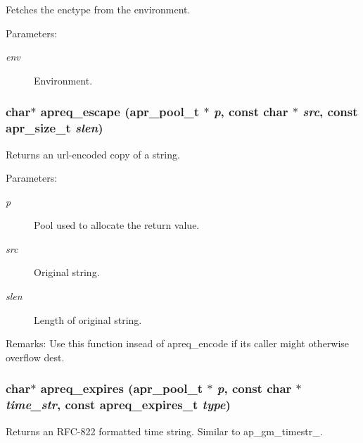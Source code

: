Fetches the enctype from the environment. \begin{Desc}
\item[Parameters:]
\begin{description}
\item[{\em env}]Environment. \end{description}
\end{Desc}
\subsubsection{\setlength{\rightskip}{0pt plus 5cm}char$\ast$ apreq\_\-escape ({\bf apr\_\-pool\_\-t} $\ast$ {\em p}, const char $\ast$ {\em src}, const {\bf apr\_\-size\_\-t} {\em slen})}\label{group__Utils_a13}


Returns an url-encoded copy of a string. \begin{Desc}
\item[Parameters:]
\begin{description}
\item[{\em p}]Pool used to allocate the return value. \item[{\em src}]Original string. \item[{\em slen}]Length of original string. \end{description}
\end{Desc}
\begin{Desc}
\item[Remarks:]Use this function insead of apreq\_\-encode if its caller might otherwise overflow dest. \end{Desc}
\subsubsection{\setlength{\rightskip}{0pt plus 5cm}char$\ast$ apreq\_\-expires ({\bf apr\_\-pool\_\-t} $\ast$ {\em p}, const char $\ast$ {\em time\_\-str}, const {\bf apreq\_\-expires\_\-t} {\em type})}\label{group__Utils_a15}


Returns an RFC-822 formatted time string. Similar to ap\_\-gm\_\-timestr\_.

